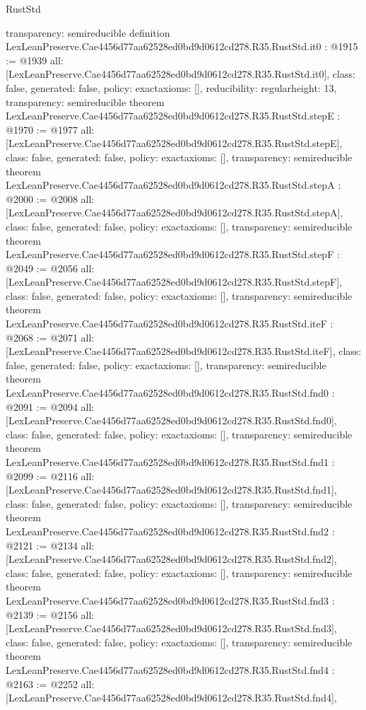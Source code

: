 \begin{lexlean}{RustStd}
\begin{coremodule}
{  transparency: semireducible
}
definition LexLeanPreserve.Cae4456d77aa62528ed0bd9d0612cd278.R35.RustStd.it0 : @1915 := @1939 {
  all: [LexLeanPreserve.Cae4456d77aa62528ed0bd9d0612cd278.R35.RustStd.it0],
  class: false,
  generated: false,
  policy: exact{axioms: []},
  reducibility: regular{height: 13},
  transparency: semireducible
}
theorem LexLeanPreserve.Cae4456d77aa62528ed0bd9d0612cd278.R35.RustStd.stepE : @1970 := @1977 {
  all: [LexLeanPreserve.Cae4456d77aa62528ed0bd9d0612cd278.R35.RustStd.stepE],
  class: false,
  generated: false,
  policy: exact{axioms: []},
  transparency: semireducible
}
theorem LexLeanPreserve.Cae4456d77aa62528ed0bd9d0612cd278.R35.RustStd.stepA : @2000 := @2008 {
  all: [LexLeanPreserve.Cae4456d77aa62528ed0bd9d0612cd278.R35.RustStd.stepA],
  class: false,
  generated: false,
  policy: exact{axioms: []},
  transparency: semireducible
}
theorem LexLeanPreserve.Cae4456d77aa62528ed0bd9d0612cd278.R35.RustStd.stepF : @2049 := @2056 {
  all: [LexLeanPreserve.Cae4456d77aa62528ed0bd9d0612cd278.R35.RustStd.stepF],
  class: false,
  generated: false,
  policy: exact{axioms: []},
  transparency: semireducible
}
theorem LexLeanPreserve.Cae4456d77aa62528ed0bd9d0612cd278.R35.RustStd.iteF : @2068 := @2071 {
  all: [LexLeanPreserve.Cae4456d77aa62528ed0bd9d0612cd278.R35.RustStd.iteF],
  class: false,
  generated: false,
  policy: exact{axioms: []},
  transparency: semireducible
}
theorem LexLeanPreserve.Cae4456d77aa62528ed0bd9d0612cd278.R35.RustStd.fnd0 : @2091 := @2094 {
  all: [LexLeanPreserve.Cae4456d77aa62528ed0bd9d0612cd278.R35.RustStd.fnd0],
  class: false,
  generated: false,
  policy: exact{axioms: []},
  transparency: semireducible
}
theorem LexLeanPreserve.Cae4456d77aa62528ed0bd9d0612cd278.R35.RustStd.fnd1 : @2099 := @2116 {
  all: [LexLeanPreserve.Cae4456d77aa62528ed0bd9d0612cd278.R35.RustStd.fnd1],
  class: false,
  generated: false,
  policy: exact{axioms: []},
  transparency: semireducible
}
theorem LexLeanPreserve.Cae4456d77aa62528ed0bd9d0612cd278.R35.RustStd.fnd2 : @2121 := @2134 {
  all: [LexLeanPreserve.Cae4456d77aa62528ed0bd9d0612cd278.R35.RustStd.fnd2],
  class: false,
  generated: false,
  policy: exact{axioms: []},
  transparency: semireducible
}
theorem LexLeanPreserve.Cae4456d77aa62528ed0bd9d0612cd278.R35.RustStd.fnd3 : @2139 := @2156 {
  all: [LexLeanPreserve.Cae4456d77aa62528ed0bd9d0612cd278.R35.RustStd.fnd3],
  class: false,
  generated: false,
  policy: exact{axioms: []},
  transparency: semireducible
}
theorem LexLeanPreserve.Cae4456d77aa62528ed0bd9d0612cd278.R35.RustStd.fnd4 : @2163 := @2252 {
  all: [LexLeanPreserve.Cae4456d77aa62528ed0bd9d0612cd278.R35.RustStd.fnd4],
}
\end{coremodule}
\end{lexlean}
